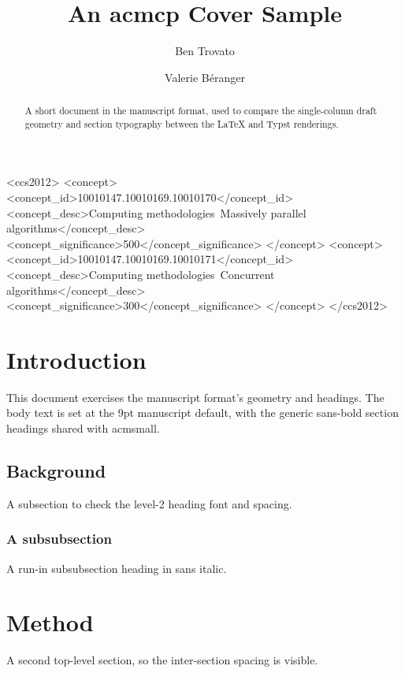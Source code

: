 \documentclass[acmcp]{acmart}
\begin{document}
\title{An acmcp Cover Sample}

\author{Ben Trovato}

\author{Valerie B\'eranger}

\begin{abstract}
  A short document in the manuscript format, used to compare the single-column
  draft geometry and section typography between the LaTeX and Typst renderings.
\end{abstract}


\begin{CCSXML}
<ccs2012>
 <concept>
  <concept_id>10010147.10010169.10010170</concept_id>
  <concept_desc>Computing methodologies~Massively parallel algorithms</concept_desc>
  <concept_significance>500</concept_significance>
 </concept>
 <concept>
  <concept_id>10010147.10010169.10010171</concept_id>
  <concept_desc>Computing methodologies~Concurrent algorithms</concept_desc>
  <concept_significance>300</concept_significance>
 </concept>
</ccs2012>
\end{CCSXML}


\maketitle

\section{Introduction}
This document exercises the manuscript format's geometry and headings. The body
text is set at the 9pt manuscript default, with the generic sans-bold section
headings shared with acmsmall.

\subsection{Background}
A subsection to check the level-2 heading font and spacing.

\subsubsection{A subsubsection}
A run-in subsubsection heading in sans italic.

\section{Method}
A second top-level section, so the inter-section spacing is visible.
\end{document}
